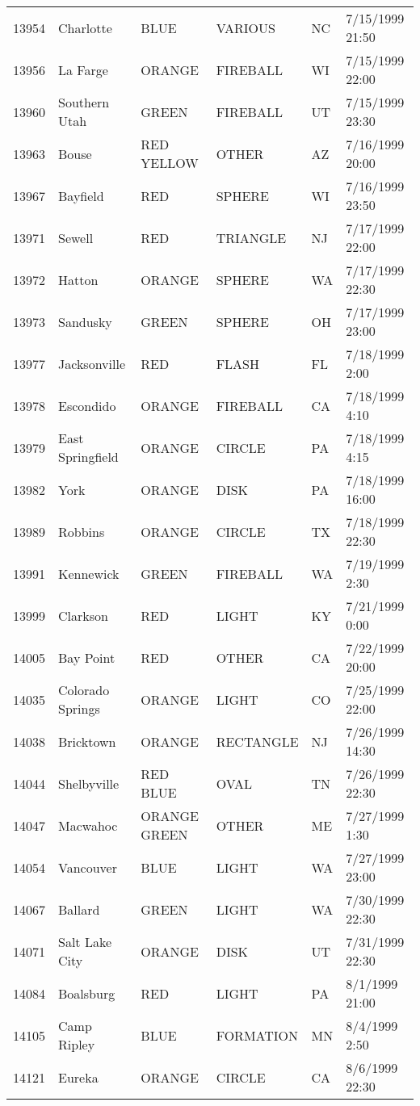 \begin{tabular}{llllll}
13954 & Charlotte & BLUE & VARIOUS & NC & 7/15/1999 21:50 \\
13956 & La Farge & ORANGE & FIREBALL & WI & 7/15/1999 22:00 \\
13960 & Southern Utah & GREEN & FIREBALL & UT & 7/15/1999 23:30 \\
13963 & Bouse & RED YELLOW & OTHER & AZ & 7/16/1999 20:00 \\
13967 & Bayfield & RED & SPHERE & WI & 7/16/1999 23:50 \\
13971 & Sewell & RED & TRIANGLE & NJ & 7/17/1999 22:00 \\
13972 & Hatton & ORANGE & SPHERE & WA & 7/17/1999 22:30 \\
13973 & Sandusky & GREEN & SPHERE & OH & 7/17/1999 23:00 \\
13977 & Jacksonville & RED & FLASH & FL & 7/18/1999 2:00 \\
13978 & Escondido & ORANGE & FIREBALL & CA & 7/18/1999 4:10 \\
13979 & East Springfield & ORANGE & CIRCLE & PA & 7/18/1999 4:15 \\
13982 & York & ORANGE & DISK & PA & 7/18/1999 16:00 \\
13989 & Robbins & ORANGE & CIRCLE & TX & 7/18/1999 22:30 \\
13991 & Kennewick & GREEN & FIREBALL & WA & 7/19/1999 2:30 \\
13999 & Clarkson & RED & LIGHT & KY & 7/21/1999 0:00 \\
14005 & Bay Point & RED & OTHER & CA & 7/22/1999 20:00 \\
14035 & Colorado Springs & ORANGE & LIGHT & CO & 7/25/1999 22:00 \\
14038 & Bricktown & ORANGE & RECTANGLE & NJ & 7/26/1999 14:30 \\
14044 & Shelbyville & RED BLUE & OVAL & TN & 7/26/1999 22:30 \\
14047 & Macwahoc & ORANGE GREEN & OTHER & ME & 7/27/1999 1:30 \\
14054 & Vancouver & BLUE & LIGHT & WA & 7/27/1999 23:00 \\
14067 & Ballard & GREEN & LIGHT & WA & 7/30/1999 22:30 \\
14071 & Salt Lake City & ORANGE & DISK & UT & 7/31/1999 22:30 \\
14084 & Boalsburg & RED & LIGHT & PA & 8/1/1999 21:00 \\
14105 & Camp Ripley & BLUE & FORMATION & MN & 8/4/1999 2:50 \\
14121 & Eureka & ORANGE & CIRCLE & CA & 8/6/1999 22:30 \\

\end{tabular}
